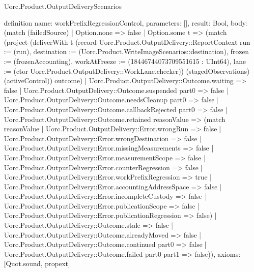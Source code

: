 \begin{lexlean}{Uorc.Product.OutputDeliveryScenarios}
\begin{semanticmodule}
definition{
  name: workPrefixRegressionControl,
  parameters: [],
  result: Bool,
  body: (match (failedSource)
    | Option.none => false
    | Option.some t => (match (project (deliverWith t (record Uorc.Product.OutputDelivery::ReportContext {run := (run), destination := (Uorc.Product.WriteImageScenarios::destination), frozen := (frozenAccounting), workAtFreeze := (18446744073709551615 : UInt64), lane := (ctor Uorc.Product.OutputDelivery::WorkLane.checker)}) (stagedObservations) (activeControl)) outcome)
      | Uorc.Product.OutputDelivery::Outcome.waiting => false
      | Uorc.Product.OutputDelivery::Outcome.suspended part0 => false
      | Uorc.Product.OutputDelivery::Outcome.needsCleanup part0 => false
      | Uorc.Product.OutputDelivery::Outcome.callbackRejected part0 => false
      | Uorc.Product.OutputDelivery::Outcome.retained reasonValue => (match reasonValue
        | Uorc.Product.OutputDelivery::Error.wrongRun => false
        | Uorc.Product.OutputDelivery::Error.wrongDestination => false
        | Uorc.Product.OutputDelivery::Error.missingMeasurements => false
        | Uorc.Product.OutputDelivery::Error.measurementScope => false
        | Uorc.Product.OutputDelivery::Error.counterRegression => false
        | Uorc.Product.OutputDelivery::Error.workPrefixRegression => true
        | Uorc.Product.OutputDelivery::Error.accountingAddressSpace => false
        | Uorc.Product.OutputDelivery::Error.incompleteCustody => false
        | Uorc.Product.OutputDelivery::Error.publicationScope => false
        | Uorc.Product.OutputDelivery::Error.publicationRegression => false)
      | Uorc.Product.OutputDelivery::Outcome.stale => false
      | Uorc.Product.OutputDelivery::Outcome.alreadyMoved => false
      | Uorc.Product.OutputDelivery::Outcome.continued part0 => false
      | Uorc.Product.OutputDelivery::Outcome.failed part0 part1 => false)),
  axioms: [Quot.sound, propext]
}


\end{semanticmodule}
\end{lexlean}
